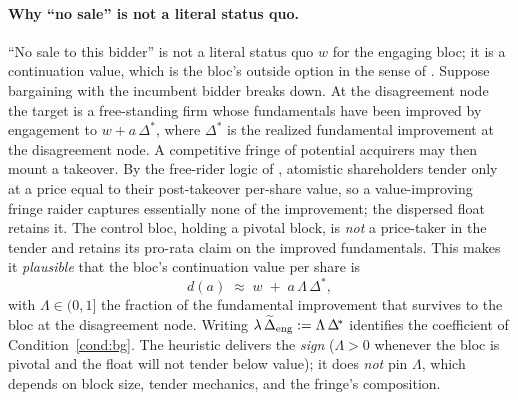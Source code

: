\paragraph{Why ``no sale'' is not a literal status quo.}
``No sale to this bidder'' is not a literal status quo $w$ for the engaging bloc;
it is a continuation value, which is the bloc's outside option in the sense of
\citet{BinmoreRubinsteinWolinsky1986}. Suppose bargaining with the incumbent
bidder breaks down. At the disagreement node the target is a free-standing firm
whose fundamentals have been improved by engagement to $w+a\,\Delta^{\!*}$, where
$\Delta^{\!*}$ is the realized fundamental improvement at the disagreement node. A
competitive fringe of potential acquirers may then mount a takeover. By the
free-rider logic of \citet{GrossmanHart1980}, atomistic shareholders tender only
at a price equal to their post-takeover per-share value, so a value-improving
fringe raider captures essentially none of the improvement; the dispersed float
retains it. The control bloc, holding a pivotal block, is \emph{not} a
price-taker in the tender and retains its pro-rata claim on the improved
fundamentals. This makes it \emph{plausible} that the bloc's continuation value
per share is
\begin{equation}
  \label{eq:bg-threat-motiv}
  d(a)\;\approx\;w\;+\;a\,\Lambda\,\Delta^{\!*},
\end{equation}
with $\Lambda\in(0,1]$ the fraction of the fundamental improvement that survives
to the bloc at the disagreement node. Writing
$\lambda\,\widetilde{\Delta}_{\mathrm{eng}}:=\Lambda\,\Delta^{\!*}$ identifies the coefficient
of Condition~\ref{cond:bg}. The heuristic delivers the \emph{sign} ($\Lambda>0$
whenever the bloc is pivotal and the float will not tender below value); it does
\emph{not} pin $\Lambda$, which depends on block size, tender mechanics, and the
fringe's composition.

